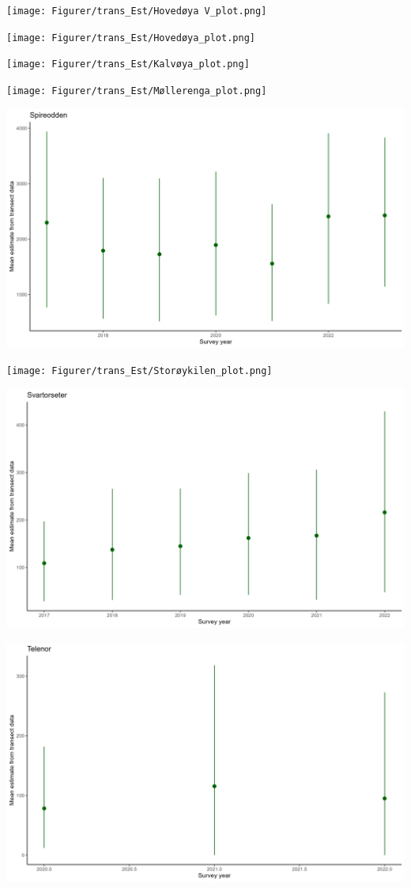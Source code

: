 \documentclass[
  letterpaper,
  DIV=11,
  numbers=noendperiod]{scrreport}
\begin{document}
\texttt{[image: Figurer/trans\_Est/Hovedøya V\_plot.png]}

\texttt{[image: Figurer/trans\_Est/Hovedøya\_plot.png]}

\texttt{[image: Figurer/trans\_Est/Kalvøya\_plot.png]}

\texttt{[image: Figurer/trans\_Est/Møllerenga\_plot.png]}

\includegraphics{Figurer/trans_Est/Spireodden_plot.png}

\texttt{[image: Figurer/trans\_Est/Storøykilen\_plot.png]}

\includegraphics{Figurer/trans_Est/Svartorseter_plot.png}

\includegraphics{Figurer/trans_Est/Telenor_plot.png}
\end{document}
